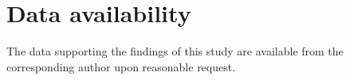 \documentclass[a4paper,fleqn]{cas-sc}
\begin{document}
\section*{Data availability}
The data supporting the findings of this study are available from the corresponding author upon reasonable request.


\printcredits



\end{document}
